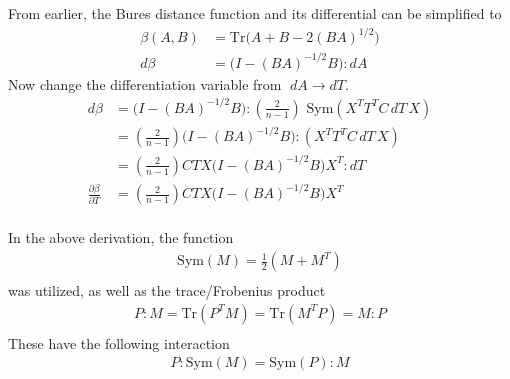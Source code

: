 From earlier, the Bures distance function and its differential can be simplified to
\begin{align*}
	\beta(A,B) &= \textrm{Tr}\Big(A+B - 2(BA)^{1/2} \Big) \\
	d\beta &=\Big(I - (BA)^{-1/2}B\Big):dA
\end{align*}
Now change the differentiation variable from $\;dA\to dT$.
\begin{align*}
	d\beta
	&= \Big(I - (BA)^{-1/2}B\Big):\left(\tfrac 2{n-1}\right)\textrm{ Sym}(X^TT^TC\,dT\,X) \\
	&= \left(\tfrac 2{n-1}\right)\Big(I - (BA)^{-1/2}B\Big):(X^TT^TC\,dT\,X) \\
	&= \left(\tfrac 2{n-1}\right)CTX\Big(I - (BA)^{-1/2}B\Big)X^T:dT \\
	\frac{\partial\beta}{\partial T}
	&= \left(\tfrac 2{n-1}\right)CTX\Big(I - (BA)^{-1/2}B\Big)X^T \\
\end{align*}

In the above derivation, the function 
\begin{align*}
	\textrm{Sym}(M) = \tfrac 12(M+M^T) \\
\end{align*}
was utilized, as well as the trace/Frobenius product
\begin{align*}
	P:M = \textrm{Tr}(P^TM) = \textrm{Tr}(M^TP) = M:P \\
\end{align*}
These have the following interaction 
\begin{align*}
	P:\textrm{Sym}(M) = \textrm{Sym}(P):M \\
\end{align*}